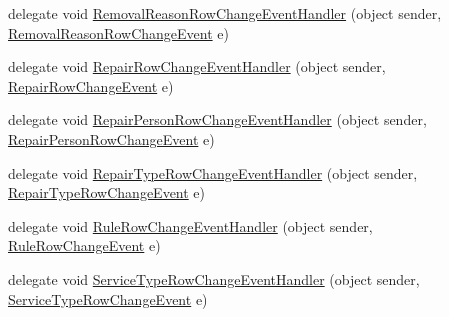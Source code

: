 \begin{DoxyCompactItemize}
delegate void \hyperlink{class_env_int_1_1_win32_1_1_field_tech_1_1_manager_1_1_data_sets_1_1_guide_ware_mobile_data_set_a9e8d3bdd1299c308c92a189d287e41cc}{Removal\+Reason\+Row\+Change\+Event\+Handler} (object sender, \hyperlink{class_env_int_1_1_win32_1_1_field_tech_1_1_manager_1_1_data_sets_1_1_guide_ware_mobile_data_set_deb38dea927d9374a60c90d1719a477f}{Removal\+Reason\+Row\+Change\+Event} e)
\item 
delegate void \hyperlink{class_env_int_1_1_win32_1_1_field_tech_1_1_manager_1_1_data_sets_1_1_guide_ware_mobile_data_set_a5a18a00a70efa6bcaef5991835432d89}{Repair\+Row\+Change\+Event\+Handler} (object sender, \hyperlink{class_env_int_1_1_win32_1_1_field_tech_1_1_manager_1_1_data_sets_1_1_guide_ware_mobile_data_set_1_1_repair_row_change_event}{Repair\+Row\+Change\+Event} e)
\item 
delegate void \hyperlink{class_env_int_1_1_win32_1_1_field_tech_1_1_manager_1_1_data_sets_1_1_guide_ware_mobile_data_set_ab1d968fc848ee5de7b5a0eeeb994bdc7}{Repair\+Person\+Row\+Change\+Event\+Handler} (object sender, \hyperlink{class_env_int_1_1_win32_1_1_field_tech_1_1_manager_1_1_data_sets_1_1_guide_ware_mobile_data_set_9c921e67e64bbad224f4e7d364257dc3}{Repair\+Person\+Row\+Change\+Event} e)
\item 
delegate void \hyperlink{class_env_int_1_1_win32_1_1_field_tech_1_1_manager_1_1_data_sets_1_1_guide_ware_mobile_data_set_a9f766443fb197a07ea703f54c2a73232}{Repair\+Type\+Row\+Change\+Event\+Handler} (object sender, \hyperlink{class_env_int_1_1_win32_1_1_field_tech_1_1_manager_1_1_data_sets_1_1_guide_ware_mobile_data_set_86bb317b23e29e52c68c56fabaaadc6a}{Repair\+Type\+Row\+Change\+Event} e)
\item 
delegate void \hyperlink{class_env_int_1_1_win32_1_1_field_tech_1_1_manager_1_1_data_sets_1_1_guide_ware_mobile_data_set_af0c77bdb6e864f191e2dc93da00143ad}{Rule\+Row\+Change\+Event\+Handler} (object sender, \hyperlink{class_env_int_1_1_win32_1_1_field_tech_1_1_manager_1_1_data_sets_1_1_guide_ware_mobile_data_set_1_1_rule_row_change_event}{Rule\+Row\+Change\+Event} e)
\item 
delegate void \hyperlink{class_env_int_1_1_win32_1_1_field_tech_1_1_manager_1_1_data_sets_1_1_guide_ware_mobile_data_set_a8baede567c8baef2eb4b07c41d1b8a0b}{Service\+Type\+Row\+Change\+Event\+Handler} (object sender, \hyperlink{class_env_int_1_1_win32_1_1_field_tech_1_1_manager_1_1_data_sets_1_1_guide_ware_mobile_data_set_ce05812940788b7afd8b26922eaaec12}{Service\+Type\+Row\+Change\+Event} e)
\item 

\end{DoxyCompactItemize}
